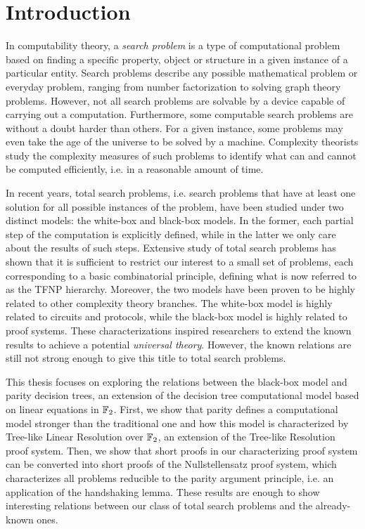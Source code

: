 
\chapter*{Introduction} 

In computability theory, a \textit{search problem} is a type of computational problem based on finding a specific property, object or structure in a given instance of a particular entity. Search problems describe any possible mathematical problem or everyday problem, ranging from number factorization to solving graph theory problems. However, not all search problems are solvable by a device capable of carrying out a computation. Furthermore, some computable search problems are without a doubt harder than others. For a given instance, some problems may even take the age of the universe to be solved by a machine. Complexity theorists study the complexity measures of such problems to identify what can and cannot be computed efficiently, i.e. in a reasonable amount of time.

In recent years, total search problems, i.e. search problems that have at least one solution for all possible instances of the problem, have been studied under two distinct models: the white-box and black-box models. In the former, each partial step of the computation is explicitly defined, while in the latter we only care about the results of such steps. Extensive study of total search problems has shown that it is sufficient to restrict our interest to a small set of problems, each corresponding to a basic combinatorial principle, defining what is now referred to as the \textsf{TFNP} hierarchy. 
Moreover, the two models have been proven to be highly related to other complexity theory branches. The white-box model is highly related to circuits and protocols, while the black-box model is highly related to proof systems. These characterizations inspired researchers to extend the known results to achieve a potential \textit{universal theory}. However, the known relations are still not strong enough to give this title to total search problems.

This thesis focuses on exploring the relations between the black-box model and parity decision trees, an extension of the decision tree computational model based on linear equations in $\mathbb{F}_2$. First, we show that parity defines a computational model stronger than the traditional one and how this model is characterized by Tree-like Linear Resolution over $\mathbb{F}_2$, an extension of the Tree-like Resolution proof system. Then, we show that short proofs in our characterizing proof system can be converted into short proofs of the Nullstellensatz proof system, which characterizes all problems reducible to the parity argument principle, i.e. an application of the handshaking lemma. These results are enough to show interesting relations between our class of total search problems and the already-known ones.



\cleardoublepage